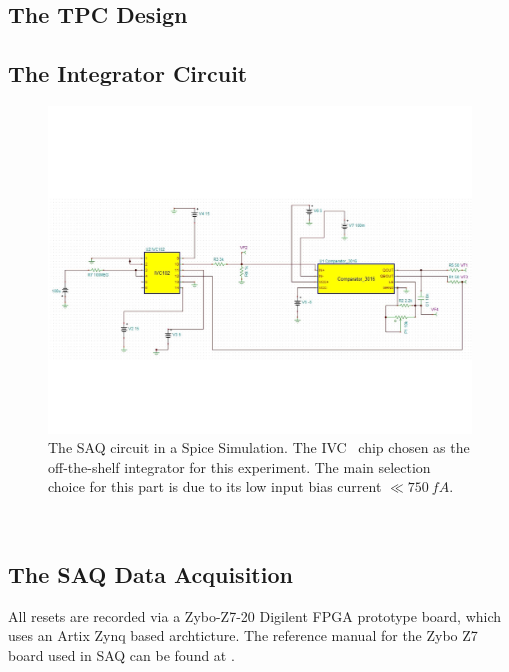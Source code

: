 \subsection{The TPC Design}

\subsection{The Integrator Circuit}



\begin{figure}[]
\centering
\includegraphics[width=\textwidth]{images/SAQ_spice_circuit.pdf}
\caption{The SAQ circuit in a Spice Simulation. The IVC~\citep{ivc_datasheet} chip chosen as the off-the-shelf integrator for this experiment. The main selection choice for this part is due to its low input bias current $\ll 750~\unit{fA}$.}
\end{figure}~\label{fig:saq_circuit_spice}


\subsection{The SAQ Data Acquisition}

All resets are recorded via a Zybo-Z7-20 Digilent FPGA prototype board, which uses an Artix Zynq based archticture.
The reference manual for the Zybo Z7 board used in SAQ can be found at \citep{zybo_zy_reference}.

